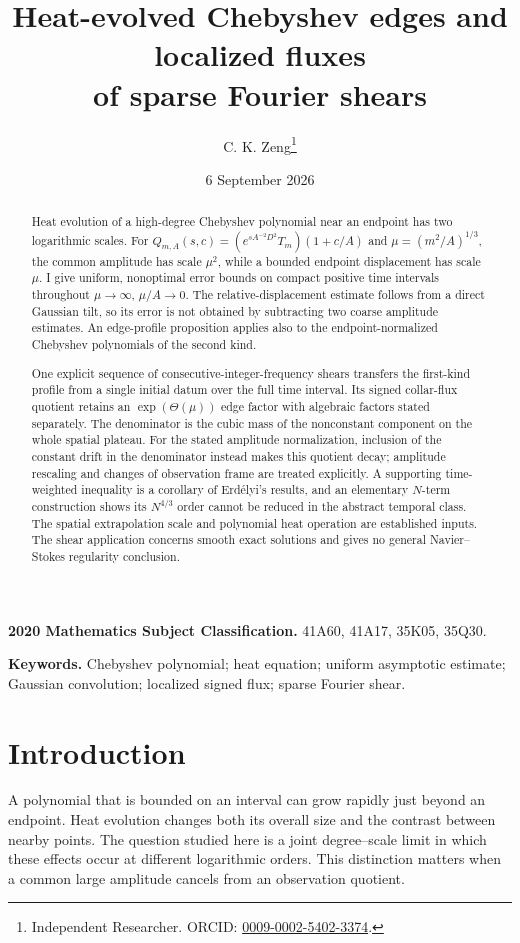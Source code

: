 \documentclass[11pt]{article}
\title{Heat-evolved Chebyshev edges and localized fluxes\\
of sparse Fourier shears}
\author{C. K. Zeng\thanks{Independent Researcher.
ORCID: \href{https://orcid.org/0009-0002-5402-3374}{0009-0002-5402-3374}.}}
\date{6 September 2026}
\theoremstyle{definition}
\begin{document}
\maketitle

\begin{abstract}
Heat evolution of a high-degree Chebyshev polynomial near an endpoint
has two logarithmic scales. For
$Q_{m,A}(s,c)=(e^{sA^{-2}D^2}T_m)(1+c/A)$ and
$\mu=(m^2/A)^{1/3}$, the common amplitude has scale $\mu^2$,
while a bounded endpoint displacement has scale $\mu$.
I give uniform, nonoptimal error bounds on compact positive time
intervals throughout $\mu\to\infty$, $\mu/A\to0$.
The relative-displacement estimate follows from a direct Gaussian tilt,
so its error is not obtained by subtracting two coarse amplitude estimates.
An edge-profile proposition applies also to the endpoint-normalized
Chebyshev polynomials of the second kind.

One explicit sequence of consecutive-integer-frequency shears transfers
the first-kind profile from a single initial datum over the full time
interval. Its signed collar-flux quotient retains an
$\exp(\Theta(\mu))$ edge factor with algebraic factors stated separately.
The denominator is the cubic mass of the nonconstant component on the
whole spatial plateau. For the stated amplitude normalization, inclusion
of the constant drift in the denominator instead makes this quotient
decay; amplitude rescaling and changes of observation frame are treated
explicitly. A supporting time-weighted inequality is a corollary of
Erd\'elyi's results, and an elementary $N$-term construction shows its
$N^{4/3}$ order cannot be reduced in the abstract temporal class.
The spatial extrapolation scale and polynomial heat operation are
established inputs. The shear application concerns smooth exact solutions
and gives no general Navier--Stokes regularity conclusion.
\end{abstract}

\medskip
\noindent\textbf{2020 Mathematics Subject Classification.}
41A60, 41A17, 35K05, 35Q30.

\noindent\textbf{Keywords.}
Chebyshev polynomial; heat equation; uniform asymptotic estimate;
Gaussian convolution; localized signed flux; sparse Fourier shear.

\section{Introduction}\label{sec:introduction}

A polynomial that is bounded on an interval can grow rapidly just
beyond an endpoint. Heat evolution changes both its overall size and
the contrast between nearby points. The question studied here is a
joint degree--scale limit in which these effects occur at different
logarithmic orders. This distinction matters when a common large
amplitude cancels from an observation quotient.
\end{document}
